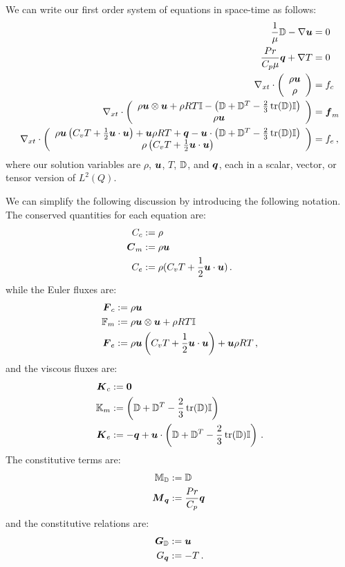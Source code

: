 \documentclass[Dissertation.tex]{subfiles}
\begin{document}
We can write our first order system of equations in space-time as follows:
\begin{subequations}
\label{eq:compressibleNSFirstOrder}
\begin{align}
	\frac{1}{\mu}\mathbb{D}-\nabla\boldsymbol u&=0\\
	\frac{Pr}{C_p\mu}\boldsymbol q+\nabla T&=0\\
	\nabla_{xt}\cdot\left( \begin{array}{c} \rho\boldsymbol u\\ \rho\\ \end{array} \right)&=f_c\\
	\nabla_{xt}\cdot\left( \begin{array}{c} \rho\boldsymbol u\otimes\boldsymbol u+\rho RT\mathbb{I}-\left( \mathbb{D}+\mathbb{D}^T-\frac{2}{3}\operatorname*{tr}(\mathbb{D})\mathbb{I} \right)\\ \rho\boldsymbol u\\ \end{array} \right)&=\boldsymbol f_m\\
	\nabla_{xt}\cdot\left( \begin{array}{c} \rho\boldsymbol u\left( C_v T+\frac{1}{2}\boldsymbol u\cdot\boldsymbol u \right)+\boldsymbol u\rho RT+\boldsymbol q
	-\boldsymbol u\cdot\left( \mathbb{D}+\mathbb{D}^T-\frac{2}{3}\operatorname*{tr}(\mathbb{D})\mathbb{I} \right)\\ \rho\left( C_v T+\frac{1}{2}\boldsymbol u\cdot\boldsymbol u \right)\\ \end{array} \right)&=f_e\,,
\end{align}
\end{subequations}
where our solution variables are $\rho$, $\boldsymbol u$, $T$, $\mathbb{D}$, and $\boldsymbol q$, each in a scalar, vector, or tensor version of $L^2(Q)$.

We can simplify the following discussion by introducing the following notation. 
The conserved quantities for each equation are:
\begin{align*}
C_c&:=\rho\\
\boldsymbol C_m&:=\rho\boldsymbol u\\
C_e&:=\rho(C_v T+\frac{1}{2}\boldsymbol u\cdot\boldsymbol u)\,.
\end{align*}
while the Euler fluxes are:
\begin{align*}
\boldsymbol F_c&:=\rho\boldsymbol u\\
\mathbb{F}_m&:=\rho\boldsymbol u\otimes\boldsymbol u+\rho RT\mathbb{I}\\
\boldsymbol F_e&:=\rho\boldsymbol u\left( C_v T+\frac{1}{2}\boldsymbol u\cdot\boldsymbol u \right)+\boldsymbol u\rho RT\,,
\end{align*}
and the viscous fluxes are:
\begin{align*}
\boldsymbol K_c&:=\boldsymbol 0\\
\mathbb{K}_m&:=\left( \mathbb{D}+\mathbb{D}^T-\frac{2}{3}\operatorname*{tr}(\mathbb{D})\mathbb{I} \right)\\
\boldsymbol K_e&:=-\boldsymbol q+\boldsymbol u\cdot\left( \mathbb{D}+\mathbb{D}^T-\frac{2}{3}\operatorname*{tr}(\mathbb{D})\mathbb{I} \right)\,.
\end{align*}
The constitutive terms are:
\begin{align*}
\mathbb{M}_{\mathbb{D}}&:=\mathbb{D}\\
\boldsymbol M_{\boldsymbol q}&:=\frac{Pr}{C_p}\boldsymbol q\,
\end{align*}
and the constitutive relations are:
\begin{align*}
\boldsymbol G_{\mathbb{D}}&:=\boldsymbol u\\
G_{\boldsymbol q}&:=-T\,.
\end{align*}
\end{document}
